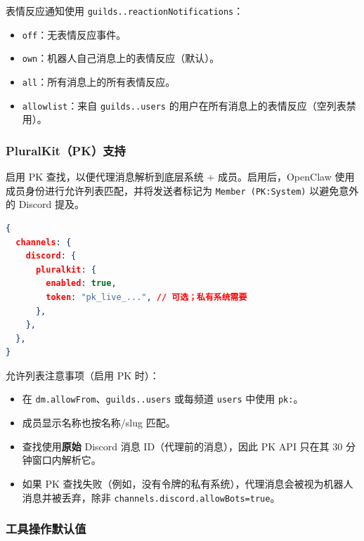 表情反应通知使用 \texttt{guilds..reactionNotifications}：

\begin{itemize}
  \item \texttt{off}：无表情反应事件。
  \item \texttt{own}：机器人自己消息上的表情反应（默认）。
  \item \texttt{all}：所有消息上的所有表情反应。
  \item \texttt{allowlist}：来自 \texttt{guilds..users} 的用户在所有消息上的表情反应（空列表禁用）。
\end{itemize}


\subsubsection{PluralKit（PK）支持}


启用 PK 查找，以便代理消息解析到底层系统 + 成员。启用后，OpenClaw 使用成员身份进行允许列表匹配，并将发送者标记为 \texttt{Member (PK:System)} 以避免意外的 Discord 提及。

\begin{lstlisting}[language=json]
{
  channels: {
    discord: {
      pluralkit: {
        enabled: true,
        token: "pk_live_...", // 可选；私有系统需要
      },
    },
  },
}
\end{lstlisting}


允许列表注意事项（启用 PK 时）：

\begin{itemize}
  \item 在 \texttt{dm.allowFrom}、\texttt{guilds..users} 或每频道 \texttt{users} 中使用 \texttt{pk:}。
  \item 成员显示名称也按名称/slug 匹配。
  \item 查找使用\textbf{原始} Discord 消息 ID（代理前的消息），因此 PK API 只在其 30 分钟窗口内解析它。
  \item 如果 PK 查找失败（例如，没有令牌的私有系统），代理消息会被视为机器人消息并被丢弃，除非 \texttt{channels.discord.allowBots=true}。
\end{itemize}


\subsubsection{工具操作默认值}



